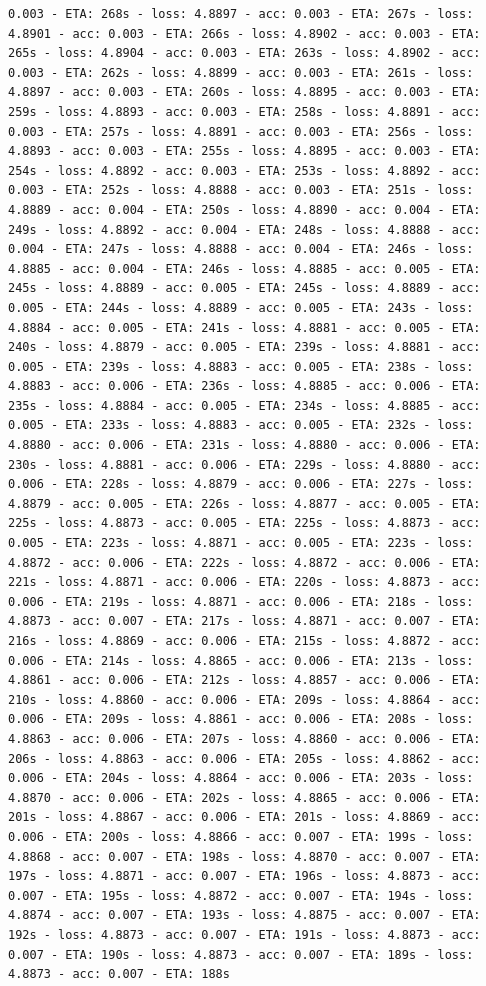 \documentclass[11pt]{article}
\begin{document}
\begin{Verbatim}[commandchars=\\\{\}]
0.003 - ETA: 268s - loss: 4.8897 - acc: 0.003 - ETA: 267s - loss: 4.8901 - acc: 0.003 - ETA: 266s - loss: 4.8902 - acc: 0.003 - ETA: 265s - loss: 4.8904 - acc: 0.003 - ETA: 263s - loss: 4.8902 - acc: 0.003 - ETA: 262s - loss: 4.8899 - acc: 0.003 - ETA: 261s - loss: 4.8897 - acc: 0.003 - ETA: 260s - loss: 4.8895 - acc: 0.003 - ETA: 259s - loss: 4.8893 - acc: 0.003 - ETA: 258s - loss: 4.8891 - acc: 0.003 - ETA: 257s - loss: 4.8891 - acc: 0.003 - ETA: 256s - loss: 4.8893 - acc: 0.003 - ETA: 255s - loss: 4.8895 - acc: 0.003 - ETA: 254s - loss: 4.8892 - acc: 0.003 - ETA: 253s - loss: 4.8892 - acc: 0.003 - ETA: 252s - loss: 4.8888 - acc: 0.003 - ETA: 251s - loss: 4.8889 - acc: 0.004 - ETA: 250s - loss: 4.8890 - acc: 0.004 - ETA: 249s - loss: 4.8892 - acc: 0.004 - ETA: 248s - loss: 4.8888 - acc: 0.004 - ETA: 247s - loss: 4.8888 - acc: 0.004 - ETA: 246s - loss: 4.8885 - acc: 0.004 - ETA: 246s - loss: 4.8885 - acc: 0.005 - ETA: 245s - loss: 4.8889 - acc: 0.005 - ETA: 245s - loss: 4.8889 - acc: 0.005 - ETA: 244s - loss: 4.8889 - acc: 0.005 - ETA: 243s - loss: 4.8884 - acc: 0.005 - ETA: 241s - loss: 4.8881 - acc: 0.005 - ETA: 240s - loss: 4.8879 - acc: 0.005 - ETA: 239s - loss: 4.8881 - acc: 0.005 - ETA: 239s - loss: 4.8883 - acc: 0.005 - ETA: 238s - loss: 4.8883 - acc: 0.006 - ETA: 236s - loss: 4.8885 - acc: 0.006 - ETA: 235s - loss: 4.8884 - acc: 0.005 - ETA: 234s - loss: 4.8885 - acc: 0.005 - ETA: 233s - loss: 4.8883 - acc: 0.005 - ETA: 232s - loss: 4.8880 - acc: 0.006 - ETA: 231s - loss: 4.8880 - acc: 0.006 - ETA: 230s - loss: 4.8881 - acc: 0.006 - ETA: 229s - loss: 4.8880 - acc: 0.006 - ETA: 228s - loss: 4.8879 - acc: 0.006 - ETA: 227s - loss: 4.8879 - acc: 0.005 - ETA: 226s - loss: 4.8877 - acc: 0.005 - ETA: 225s - loss: 4.8873 - acc: 0.005 - ETA: 225s - loss: 4.8873 - acc: 0.005 - ETA: 223s - loss: 4.8871 - acc: 0.005 - ETA: 223s - loss: 4.8872 - acc: 0.006 - ETA: 222s - loss: 4.8872 - acc: 0.006 - ETA: 221s - loss: 4.8871 - acc: 0.006 - ETA: 220s - loss: 4.8873 - acc: 0.006 - ETA: 219s - loss: 4.8871 - acc: 0.006 - ETA: 218s - loss: 4.8873 - acc: 0.007 - ETA: 217s - loss: 4.8871 - acc: 0.007 - ETA: 216s - loss: 4.8869 - acc: 0.006 - ETA: 215s - loss: 4.8872 - acc: 0.006 - ETA: 214s - loss: 4.8865 - acc: 0.006 - ETA: 213s - loss: 4.8861 - acc: 0.006 - ETA: 212s - loss: 4.8857 - acc: 0.006 - ETA: 210s - loss: 4.8860 - acc: 0.006 - ETA: 209s - loss: 4.8864 - acc: 0.006 - ETA: 209s - loss: 4.8861 - acc: 0.006 - ETA: 208s - loss: 4.8863 - acc: 0.006 - ETA: 207s - loss: 4.8860 - acc: 0.006 - ETA: 206s - loss: 4.8863 - acc: 0.006 - ETA: 205s - loss: 4.8862 - acc: 0.006 - ETA: 204s - loss: 4.8864 - acc: 0.006 - ETA: 203s - loss: 4.8870 - acc: 0.006 - ETA: 202s - loss: 4.8865 - acc: 0.006 - ETA: 201s - loss: 4.8867 - acc: 0.006 - ETA: 201s - loss: 4.8869 - acc: 0.006 - ETA: 200s - loss: 4.8866 - acc: 0.007 - ETA: 199s - loss: 4.8868 - acc: 0.007 - ETA: 198s - loss: 4.8870 - acc: 0.007 - ETA: 197s - loss: 4.8871 - acc: 0.007 - ETA: 196s - loss: 4.8873 - acc: 0.007 - ETA: 195s - loss: 4.8872 - acc: 0.007 - ETA: 194s - loss: 4.8874 - acc: 0.007 - ETA: 193s - loss: 4.8875 - acc: 0.007 - ETA: 192s - loss: 4.8873 - acc: 0.007 - ETA: 191s - loss: 4.8873 - acc: 0.007 - ETA: 190s - loss: 4.8873 - acc: 0.007 - ETA: 189s - loss: 4.8873 - acc: 0.007 - ETA: 188s 
\end{Verbatim}
\end{document}
